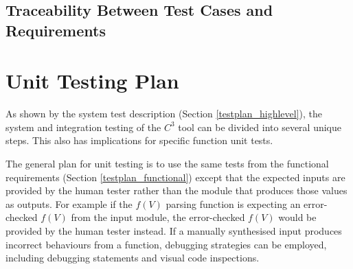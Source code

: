 \documentclass[12pt, titlepage]{article}
\newcommand{\prognameAbbrv}{$C^{3}$}
\begin{document}
%
%
%	
%	
%	
%	
%	
%	
%	
%
%
%	
%	
%	
%	
%	
%	
%	
%	
%	
%	
%	
%	
%	

\subsection{Traceability Between Test Cases and Requirements}

				
\section{Unit Testing Plan}
		
As shown by the system test description (Section \ref{testplan_highlevel}), the 
system and integration testing of the \prognameAbbrv{} tool can be divided into 
several unique steps. This also has implications for specific function unit 
tests.

The general plan for unit testing is to use the same tests from the functional 
requirements (Section \ref{testplan_functional}) except that the expected 
inputs are provided by the human tester rather than the module that produces 
those values as outputs. For example if the $f(V)$ parsing function is 
expecting an error-checked $f(V)$ from the input module, the error-checked 
$f(V)$ would be provided by the human tester instead. If a manually synthesised 
input produces incorrect behaviours from a function, debugging strategies can 
be employed, including debugging statements and visual code inspections.
\end{document}
